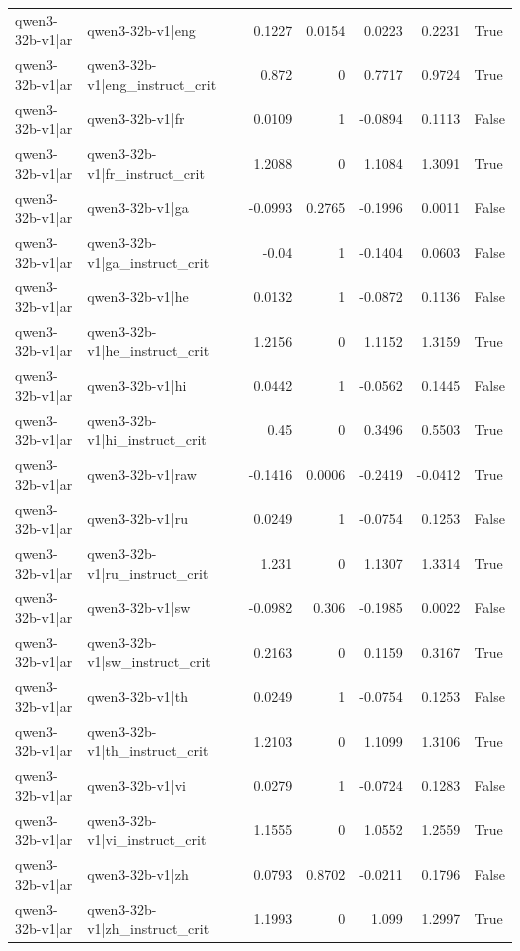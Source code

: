 \begin{table}
\begin{tabular}{l l r r r r l}
qwen3-32b-v1|ar & qwen3-32b-v1|eng & 0.1227 & 0.0154 & 0.0223 & 0.2231 & True \\
qwen3-32b-v1|ar & qwen3-32b-v1|eng_instruct_crit & 0.872 & 0 & 0.7717 & 0.9724 & True \\
qwen3-32b-v1|ar & qwen3-32b-v1|fr & 0.0109 & 1 & -0.0894 & 0.1113 & False \\
qwen3-32b-v1|ar & qwen3-32b-v1|fr_instruct_crit & 1.2088 & 0 & 1.1084 & 1.3091 & True \\
qwen3-32b-v1|ar & qwen3-32b-v1|ga & -0.0993 & 0.2765 & -0.1996 & 0.0011 & False \\
qwen3-32b-v1|ar & qwen3-32b-v1|ga_instruct_crit & -0.04 & 1 & -0.1404 & 0.0603 & False \\
qwen3-32b-v1|ar & qwen3-32b-v1|he & 0.0132 & 1 & -0.0872 & 0.1136 & False \\
qwen3-32b-v1|ar & qwen3-32b-v1|he_instruct_crit & 1.2156 & 0 & 1.1152 & 1.3159 & True \\
qwen3-32b-v1|ar & qwen3-32b-v1|hi & 0.0442 & 1 & -0.0562 & 0.1445 & False \\
qwen3-32b-v1|ar & qwen3-32b-v1|hi_instruct_crit & 0.45 & 0 & 0.3496 & 0.5503 & True \\
qwen3-32b-v1|ar & qwen3-32b-v1|raw & -0.1416 & 0.0006 & -0.2419 & -0.0412 & True \\
qwen3-32b-v1|ar & qwen3-32b-v1|ru & 0.0249 & 1 & -0.0754 & 0.1253 & False \\
qwen3-32b-v1|ar & qwen3-32b-v1|ru_instruct_crit & 1.231 & 0 & 1.1307 & 1.3314 & True \\
qwen3-32b-v1|ar & qwen3-32b-v1|sw & -0.0982 & 0.306 & -0.1985 & 0.0022 & False \\
qwen3-32b-v1|ar & qwen3-32b-v1|sw_instruct_crit & 0.2163 & 0 & 0.1159 & 0.3167 & True \\
qwen3-32b-v1|ar & qwen3-32b-v1|th & 0.0249 & 1 & -0.0754 & 0.1253 & False \\
qwen3-32b-v1|ar & qwen3-32b-v1|th_instruct_crit & 1.2103 & 0 & 1.1099 & 1.3106 & True \\
qwen3-32b-v1|ar & qwen3-32b-v1|vi & 0.0279 & 1 & -0.0724 & 0.1283 & False \\
qwen3-32b-v1|ar & qwen3-32b-v1|vi_instruct_crit & 1.1555 & 0 & 1.0552 & 1.2559 & True \\
qwen3-32b-v1|ar & qwen3-32b-v1|zh & 0.0793 & 0.8702 & -0.0211 & 0.1796 & False \\
qwen3-32b-v1|ar & qwen3-32b-v1|zh_instruct_crit & 1.1993 & 0 & 1.099 & 1.2997 & True \\

\end{tabular}
\end{table}
